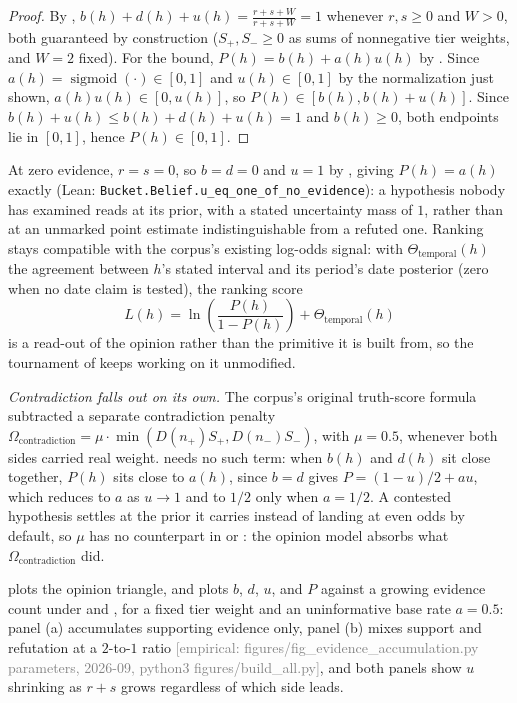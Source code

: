\documentclass[11pt]{article}
\newcommand{\emp}[1]{\textcolor{gray}{\footnotesize [empirical: #1]}}
\begin{document}
\begin{proof}
By , $b(h) + d(h) + u(h) = \frac{r+s+W}{r+s+W} = 1$
whenever $r, s \geq 0$ and $W > 0$, both guaranteed by construction
($S_{+}, S_{-} \geq 0$ as sums of nonnegative tier weights, and $W = 2$
fixed). For the bound, $P(h) = b(h) + a(h) u(h)$ by .
Since $a(h) = \operatorname{sigmoid}(\cdot) \in [0,1]$ and $u(h) \in
[0,1]$ by the normalization just shown, $a(h) u(h) \in [0, u(h)]$, so
$P(h) \in [b(h), b(h) + u(h)]$. Since $b(h) + u(h) \leq b(h) + d(h) +
u(h) = 1$ and $b(h) \geq 0$, both endpoints lie in $[0,1]$, hence
$P(h) \in [0,1]$.
\end{proof}

At zero evidence, $r = s = 0$, so $b = d = 0$ and $u = 1$ by
, giving $P(h) = a(h)$ exactly (Lean:
\texttt{Bucket.Belief.u\_eq\_one\_of\_no\_evidence}): a hypothesis nobody
has examined reads at its prior, with a stated uncertainty mass of $1$,
rather than at an unmarked point estimate indistinguishable from a
refuted one. Ranking stays compatible with the corpus's existing
log-odds signal: with $\Theta_{\mathrm{temporal}}(h)$ the agreement
between $h$'s stated interval and its period's date posterior (zero when
no date claim is tested), the ranking score
\begin{equation}
  \label{eq:rank}
  L(h) = \ln\!\left(\frac{P(h)}{1-P(h)}\right) + \Theta_{\mathrm{temporal}}(h)
\end{equation}
is a read-out of the opinion rather than the primitive it is built from,
so the tournament of  keeps working on it
unmodified.

\emph{Contradiction falls out on its own.} The corpus's original
truth-score formula subtracted a separate contradiction penalty
$\Omega_{\mathrm{contradiction}} = \mu \cdot \min(D(n_{+}) S_{+},
D(n_{-}) S_{-})$, with $\mu = 0.5$, whenever both sides carried real
weight.  needs no such term: when $b(h)$ and $d(h)$
sit close together, $P(h)$ sits close to $a(h)$, since $b = d$ gives
$P = (1-u)/2 + a u$, which reduces to $a$ as $u \to 1$ and to $1/2$ only
when $a = 1/2$. A contested hypothesis settles at the prior it carries
instead of landing at even odds by default, so $\mu$ has no counterpart
in  or : the opinion model absorbs
what $\Omega_{\mathrm{contradiction}}$ did.

 plots the opinion triangle, and
 plots $b$, $d$, $u$, and $P$ against a
growing evidence count under  and
, for a fixed tier weight and an uninformative base
rate $a = 0.5$: panel (a) accumulates supporting evidence only, panel (b)
mixes support and refutation at a $2$-to-$1$ ratio \emp{figures/fig\_evidence\_accumulation.py parameters, 2026-09, python3 figures/build\_all.py}, and both panels show
$u$ shrinking as $r+s$ grows regardless of which side leads.
\end{document}
